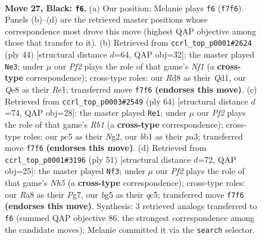 \documentclass[11pt]{article}
\begin{document}
\clearpage

\begin{figure}[p]\centering
\begin{subfigure}{0.46\textwidth}\centering
\resizebox{\linewidth}{!}{%
\newchessgame
\chessboard[
  setfen={rn1rq1k1/pp3ppp/8/2P1P1B1/4Q3/P5P1/1P3P2/1BR1R1K1 b - - 4 27},
  showmover=false,
  pgfstyle=straightmove, color=movearrow, markmove={f7-f6}
]}
\caption{}
\end{subfigure}\hfill
\begin{subfigure}{0.46\textwidth}\centering
\resizebox{\linewidth}{!}{%
\newchessgame
\chessboard[
  setfen={4rrk1/p5pp/1p2p3/3b4/3P1q2/8/PPR2PP1/3QRNK1 w - - 0 23},
  showmover=false,
  pgfstyle=straightmove, color=movearrow, markmove={f1-e3}
]}
\caption{}
\end{subfigure}
\\[4pt]
\begin{subfigure}{0.46\textwidth}\centering
\resizebox{\linewidth}{!}{%
\newchessgame
\chessboard[
  setfen={1r2r2k/7p/1p1bq3/1Q3R2/3P2pP/p1P3P1/2P3NK/1R6 w - - 1 33},
  showmover=false,
  pgfstyle=straightmove, color=movearrow, markmove={b1-e1}
]}
\caption{}
\end{subfigure}\hfill
\begin{subfigure}{0.46\textwidth}\centering
\resizebox{\linewidth}{!}{%
\newchessgame
\chessboard[
  setfen={4rrk1/p4pp1/7p/2Qp3q/5P1n/4P2P/PP2BP2/2RR1K2 b - - 6 26},
  showmover=false,
  pgfstyle=straightmove, color=movearrow, markmove={h4-f3}
]}
\caption{}
\end{subfigure}
\caption{\textbf{Move 27, Black: \texttt{f6}.} (a) Our position; Melanie plays \texttt{f6} (\texttt{f7f6}). Panels (b)--(d) are the retrieved master positions whose correspondence most drove this move (highest QAP objective among those that transfer to it). (b) Retrieved from \texttt{ccrl\_top\_p0001\#2624} (ply 44) [structural distance $d$=64, QAP obj=32]: the master played \texttt{Ne3}; under $\mu$ our \emph{Pf2} plays the role of that game's \emph{Nf1} (a \textbf{cross-type} correspondence); cross-type roles: our \emph{R}d8 as their \emph{Q}d1, our \emph{Q}e8 as their \emph{R}e1; transferred move \texttt{f7f6} \textbf{(endorses this move)}. (c) Retrieved from \texttt{ccrl\_top\_p0003\#2549} (ply 64) [structural distance $d$=74, QAP obj=28]: the master played \texttt{Re1}; under $\mu$ our \emph{Pf2} plays the role of that game's \emph{Rb1} (a \textbf{cross-type} correspondence); cross-type roles: our \emph{p}c5 as their \emph{N}g2, our \emph{b}b1 as their \emph{p}a3; transferred move \texttt{f7f6} \textbf{(endorses this move)}. (d) Retrieved from \texttt{ccrl\_top\_p0001\#3196} (ply 51) [structural distance $d$=72, QAP obj=25]: the master played \texttt{Nf3}; under $\mu$ our \emph{Pf2} plays the role of that game's \emph{Nh5} (a \textbf{cross-type} correspondence); cross-type roles: our \emph{R}a8 as their \emph{P}g7, our \emph{b}g5 as their \emph{q}c5; transferred move \texttt{f7f6} \textbf{(endorses this move)}. Synthesis: 3 retrieved analogs transferred to \texttt{f6} (summed QAP objective 86, the strongest correspondence among the candidate moves); Melanie committed it via the \texttt{search} selector.}
\label{fig:thought-m53}
\end{figure}
\end{document}
